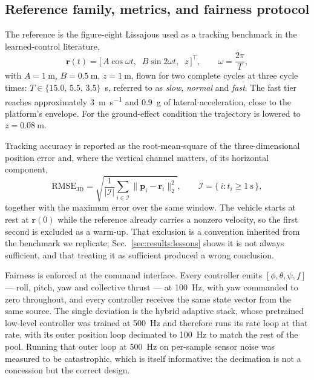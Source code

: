 \subsection{Reference family, metrics, and fairness protocol}
\label{sec:method:metrics}

The reference is the figure-eight Lissajous used as a tracking benchmark in the
learned-control literature\cite{eschmann2024learning},
\begin{equation}
  \mathbf{r}(t) = \big[\, A\cos\omega t,\;\; B\sin 2\omega t,\;\; z \,\big]^\top,
  \qquad \omega = \frac{2\pi}{T},
  \label{eq:lissajous}
\end{equation}
with $A = \SI{1}{\meter}$, $B = \SI{0.5}{\meter}$, $z = \SI{1}{\meter}$, flown for two
complete cycles at three cycle times: $T \in \{15.0,\, 5.5,\, 3.5\}$~\si{\second},
referred to as \emph{slow}, \emph{normal} and \emph{fast}. The fast tier reaches
approximately \SI{3}{\meter\per\second} and \SI{0.9}{\g} of lateral acceleration, close
to the platform's envelope. For the ground-effect condition the trajectory is lowered to
$z = \SI{0.08}{\meter}$.

Tracking accuracy is reported as the root-mean-square of the three-dimensional position
error and, where the vertical channel matters, of its horizontal component,
\begin{equation}
  \mathrm{RMSE}_{\mathrm{3D}} = \sqrt{\frac{1}{|\mathcal{I}|}\sum_{i\in\mathcal{I}}
  \lVert \mathbf{p}_i - \mathbf{r}_i \rVert_2^2},
  \qquad
  \mathcal{I} = \{\,i : t_i \ge \SI{1}{\second}\,\},
  \label{eq:rmse}
\end{equation}
together with the maximum error over the same window. The vehicle starts at rest at
$\mathbf{r}(0)$ while the reference already carries a nonzero velocity, so the first
second is excluded as a warm-up. That exclusion is a convention inherited from the
benchmark we replicate; Sec.~\ref{sec:results:lessons} shows it is not always
sufficient, and that treating it as sufficient produced a wrong conclusion.

Fairness is enforced at the command interface. Every controller emits
$[\phi,\theta,\psi,f]$ --- roll, pitch, yaw and collective thrust --- at
\SI{100}{\hertz}, with yaw commanded to zero throughout, and every controller receives
the same state vector from the same source. The single deviation is the hybrid adaptive
stack, whose pretrained low-level controller was trained at \SI{500}{\hertz} and
therefore runs its rate loop at that rate, with its outer position loop decimated to
\SI{100}{\hertz} to match the rest of the pool. Running that outer loop at
\SI{500}{\hertz} on per-sample sensor noise was measured to be catastrophic, which is
itself informative: the decimation is not a concession but the correct design.

